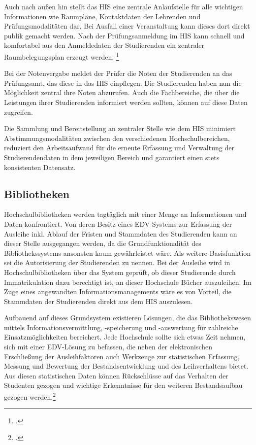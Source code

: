 Auch nach außen hin stellt das HIS eine zentrale Anlaufstelle für alle wichtigen 
Informationen wie Raumpläne, Kontaktdaten der Lehrenden und Prüfungsmodalitäten dar. Bei 
Ausfall einer Veranstaltung kann dieses dort direkt publik gemacht werden. Nach der 
Prüfungsanmeldung im HIS kann schnell und komfortabel aus den Anmeldedaten der 
Studierenden ein zentraler Raumbelegungsplan erzeugt werden.
\footcite{evalag_eckpunkte_2012}

Bei der Notenvergabe meldet der Prüfer die Noten der Studierenden an das Prüfungsamt, das 
diese in das HIS einpflegen. Die Studierenden haben nun die Möglichkeit zentral ihre Noten 
abzurufen. Auch die Fachbereiche, die über die Leistungen ihrer Studierenden informiert 
werden sollten, können auf diese Daten zugreifen.

Die Sammlung und Bereitstellung an zentraler Stelle wie dem HIS minimiert 
Abstimmungsmodalitäten zwischen den verschiedenen Hochschulbereichen, reduziert den 
Arbeitsaufwand für die erneute Erfassung und Verwaltung der Studierendendaten in dem 
jeweiligen Bereich und garantiert einen stets konsistenten Datensatz.


\subsection{Bibliotheken}
Hochschulbibliotheken werden tagtäglich mit einer Menge an Informationen und Daten 
konfrontiert. Von deren Besitz eines EDV-Systems zur Erfassung der Ausleihe inkl. Ablauf 
der Fristen und Stammdaten des Studierenden kann an dieser Stelle ausgegangen werden, da 
die Grundfunktionalität des Bibliothekssystems ansonsten kaum gewährleistet wäre. Als 
weitere Basisfunktion sei die Autorisierung der Studierenden zu nennen. Bei der Ausleihe 
wird in Hochschulbibliotheken über das System geprüft, ob dieser Studierende durch 
Immatrikulation dazu berechtigt ist, an dieser Hochschule Bücher auszuleihen. 
Im Zuge eines angewandten Informationsmanagements wäre es von Vorteil, die Stammdaten der Studierenden direkt aus dem HIS auszulesen. 

Aufbauend auf dieses Grundsystem existieren Lösungen, die das Bibliothekswesen mittels 
Informationsvermittlung, -speicherung und -auswertung für zahlreiche 
Einsatzmöglichkeiten bereichert. Jede Hochschule sollte sich etwas Zeit nehmen, sich mit 
einer EDV-Lösung zu befassen, die neben der elektronischen Erschließung der 
Ausleihfaktoren auch Werkzeuge zur statistischen Erfassung, Messung und Bewertung der 
Bestandsentwicklung und des Leihverhaltens bietet. Aus diesen statistischen Daten können 
Rückschlüsse auf das Verhalten der Studenten gezogen und wichtige Erkenntnisse für den 
weiteren Bestandsaufbau gezogen werden.\footcite[9 ff.]{merkle_aufbau_2004}

